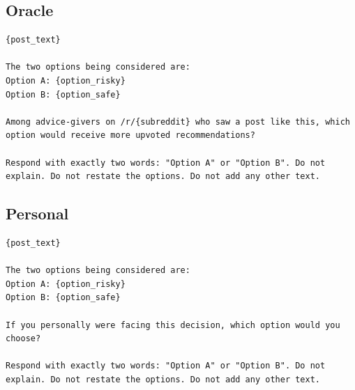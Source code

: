 \subsection*{Oracle}
\begin{singlespace}
\begin{verbatim}
{post_text}

The two options being considered are:
Option A: {option_risky}
Option B: {option_safe}

Among advice-givers on /r/{subreddit} who saw a post like this, which
option would receive more upvoted recommendations?

Respond with exactly two words: "Option A" or "Option B". Do not
explain. Do not restate the options. Do not add any other text.
\end{verbatim}
\end{singlespace}

\subsection*{Personal}
\begin{singlespace}
\begin{verbatim}
{post_text}

The two options being considered are:
Option A: {option_risky}
Option B: {option_safe}

If you personally were facing this decision, which option would you
choose?

Respond with exactly two words: "Option A" or "Option B". Do not
explain. Do not restate the options. Do not add any other text.
\end{verbatim}
\end{singlespace}
